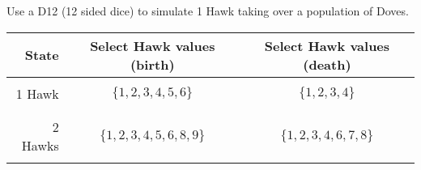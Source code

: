 \documentclass{article}
\begin{document}
Use a D12 (12 sided dice) to simulate 1 Hawk taking over a population of Doves.

\begin{center}
   \begin{tabular}{r|c|c}
        \toprule
        State & Select Hawk values (birth) & Select Hawk values (death) \\
        \midrule
                        &                         &                         \\
        1 Hawk          & \(\{1, 2, 3, 4, 5, 6\}\)         & \(\{1, 2, 3, 4\}\)           \\
                        &                         &                         \\
        \midrule
                        &                         &                         \\
        2 Hawks         & \(\{1, 2, 3, 4, 5, 6, 8, 9\}\)         & \(\{1, 2, 3, 4, 6, 7, 8\}\)     \\
                        &                         &                         \\
        \bottomrule
    \end{tabular}
\end{center}


\subsection*{}
\end{document}
